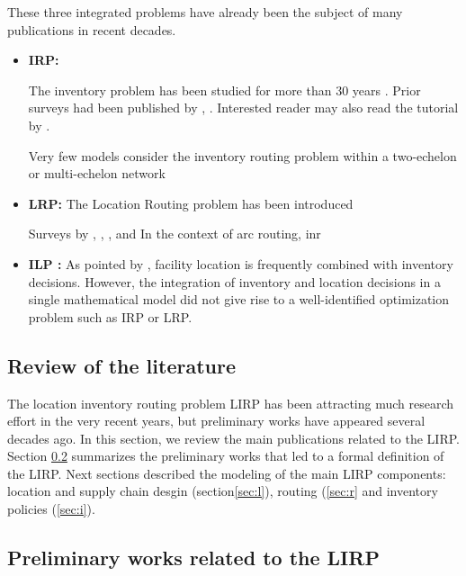 \documentclass[a4paper,10pt]{article}
\begin{document}
\begin{linenumbers}
These three integrated problems have already been the subject of many publications in recent decades.

\begin{itemize}
	
	\item \textbf{IRP: }
	
	The inventory problem has been studied for more than 30 years \citep{Coelho2014}. Prior surveys had been published by \cite{Campbell98}, \cite{MoinSalhi2007}. Interested reader may also read the tutorial by \cite{Bertazzi2012}. 
	
	Very few models consider the inventory routing problem within a two-echelon or multi-echelon network	\citep{GuimaraesCoelho2019}
	
	\item \textbf{LRP: } The Location Routing problem has been introduced 
	
	\cite{Laporte1987} 
	
	Surveys by \cite{MinJS98}, \cite{NagySahli07}, \cite{ProdhonPrins2014}, \cite{DrexlSchneider2015} and \cite{Schneider2017} 
In the context of arc routing, 	\cite{Riquelme2016} inr

	
	\item \textbf{ILP : } As pointed by \cite{Melo2009}, facility location is frequently combined with inventory decisions. However, the integration of inventory and location decisions in a single mathematical model did not give rise to a well-identified optimization problem such as IRP or LRP. 

\end{itemize}

\subsection{Review of the literature}

The location inventory routing problem LIRP has been attracting much research effort in the very recent years, but preliminary works have appeared several decades ago.  
In this section, we review the main publications related to the LIRP.
Section \ref{sec:almost} summarizes the preliminary works that led to a formal definition of the LIRP. 
Next sections described the modeling of the main LIRP components: location and supply chain desgin (section\ref{sec:l}), 
routing (\ref{sec:r} and inventory policies (\ref{sec:i}). 

\subsection{Preliminary works related to the LIRP}
\label{sec:almost}


\end{linenumbers}
\end{document}
